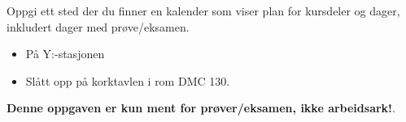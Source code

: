 

Oppgi ett sted der du finner en kalender som viser plan for kursdeler og dager, inkludert dager med prøve/eksamen.







\begin{itemize}
\item{} På Y:-stasjonen
\item{} Slått opp på korktavlen i rom DMC 130.
\end{itemize}
 






{\bf Denne oppgaven er kun ment for prøver/eksamen, ikke arbeidsark!}.



